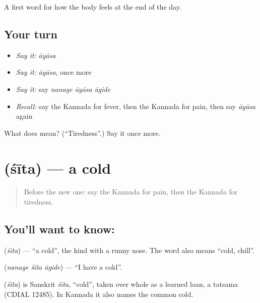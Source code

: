 \begin{grammarlens}[title={What you've built}]
A first word for how the body feels at the end of the day.
\end{grammarlens}

\subsection*{Your turn}
\begin{itemize}
\raggedright
  \item \emph{Say it:} \emph{āyāsa}
  \item \emph{Say it:} \emph{āyāsa}, once more
  \item \emph{Say it:} say \emph{nanage āyāsa āgide}
  \item \emph{Recall:} say the Kannada for fever, then the Kannada for pain, then say \emph{āyāsa} again
\end{itemize}

\begin{tcolorbox}[breakable,colback=teal!4,colframe=teal!35!black,title={Before you move on}]
What does  mean? (\textquotedblleft{}Tiredness\textquotedblright{}.) Say it once more.
\end{tcolorbox}
\section[\texorpdfstring{\kn{ಶೀತ} (śīta)}{ಶೀತ (śīta)}]{ (śīta) — a cold}

\label{lesson:KA-C82-cold}



\begin{quote}
Before the new one: say the Kannada for pain, then the Kannada for tiredness.
\end{quote}

\subsection*{You'll want to know: }
\textbf{} (\emph{śīta}) — \textquotedblleft{}a cold\textquotedblright{}, the kind with a runny nose. The word also means \textquotedblleft{}cold, chill\textquotedblright{}.

\textbf{  } (\emph{nanage śīta āgide}) — \textquotedblleft{}I have a cold\textquotedblright{}.

\begin{cousinweb}
\textbf{} (\emph{śīta}) is Sanskrit \emph{śīta}, \textquotedblleft{}cold\textquotedblright{}, taken over whole as a learned loan, a tatsama (CDIAL 12485). In Kannada it also names the common cold.
\end{cousinweb}

